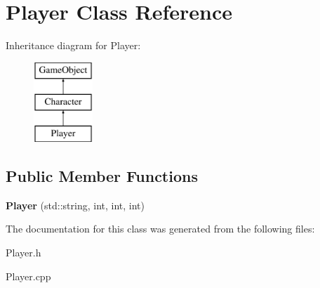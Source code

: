 \hypertarget{class_player}{}\section{Player Class Reference}
\label{class_player}
Inheritance diagram for Player\+:\begin{figure}[H]
\begin{center}
\leavevmode
\includegraphics[height=3.000000cm]{class_player}
\end{center}
\end{figure}
\subsection*{Public Member Functions}
\begin{DoxyCompactItemize}
\item 
\mbox{\label{class_player_abeb2eee0f7cf8bdd9ebbe6d1fb7d7641}} 
{\bfseries Player} (std\+::string, int, int, int)
\end{DoxyCompactItemize}


The documentation for this class was generated from the following files\+:\begin{DoxyCompactItemize}
\item 
Player.\+h\item 
Player.\+cpp\end{DoxyCompactItemize}
